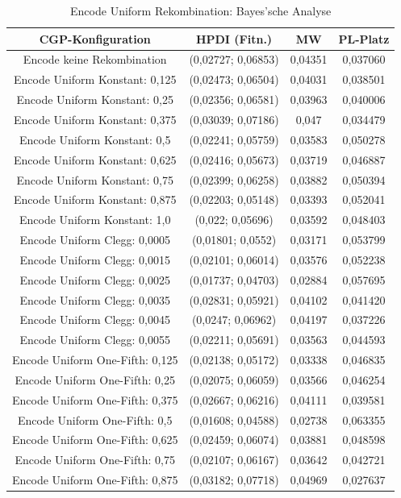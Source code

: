 \begin{table}[H]
	\centering
	\begin{tabular}{c | c | c | c}
		\textbf{CGP-Konfiguration} & \textbf{HPDI (Fitn.)} & \textbf{MW} & \textbf{PL-Platz}\\
		\hline
		Encode keine Rekombination & (0,02727; 0,06853) & 0,04351 & 0,037060\\
		\hline
		Encode Uniform Konstant: 0,125 & (0,02473; 0,06504) & 0,04031 & 0,038501\\
		\hline
		Encode Uniform Konstant: 0,25 & (0,02356; 0,06581) & 0,03963 & 0,040006\\
		\hline
		Encode Uniform Konstant: 0,375 & (0,03039; 0,07186) & 0,047 & 0,034479\\
		\hline
		Encode Uniform Konstant: 0,5 & (0,02241; 0,05759) & 0,03583 & 0,050278\\
		\hline
		Encode Uniform Konstant: 0,625 & (0,02416; 0,05673) & 0,03719 & 0,046887\\
		\hline
		Encode Uniform Konstant: 0,75 & (0,02399; 0,06258) & 0,03882 & 0,050394\\
		\hline
		Encode Uniform Konstant: 0,875 & (0,02203; 0,05148) & 0,03393 & 0,052041\\
		\hline
		Encode Uniform Konstant: 1,0 & (0,022; 0,05696) & 0,03592 & 0,048403\\
		\hline
		Encode Uniform Clegg: 0,0005 & (0,01801; 0,0552) & 0,03171 & 0,053799\\
		\hline
		Encode Uniform Clegg: 0,0015 & (0,02101; 0,06014) & 0,03576 & 0,052238\\
		\hline
		Encode Uniform Clegg: 0,0025 & (0,01737; 0,04703) & 0,02884 & 0,057695\\
		\hline
		Encode Uniform Clegg: 0,0035 & (0,02831; 0,05921) & 0,04102 & 0,041420\\
		\hline
		Encode Uniform Clegg: 0,0045 & (0,0247; 0,06962) & 0,04197 & 0,037226\\
		\hline
		Encode Uniform Clegg: 0,0055 & (0,02211; 0,05691) & 0,03563 & 0,044593\\
		\hline
		Encode Uniform One-Fifth: 0,125 & (0,02138; 0,05172) & 0,03338 & 0,046835\\
		\hline
		Encode Uniform One-Fifth: 0,25 & (0,02075; 0,06059) & 0,03566 & 0,046254\\
		\hline
		Encode Uniform One-Fifth: 0,375 & (0,02667; 0,06216) & 0,04111 & 0,039581\\
		\hline
		Encode Uniform One-Fifth: 0,5 & (0,01608; 0,04588) & 0,02738 & 0,063355\\
		\hline
		Encode Uniform One-Fifth: 0,625 & (0,02459; 0,06074) & 0,03881 & 0,048598\\
		\hline
		Encode Uniform One-Fifth: 0,75 & (0,02107; 0,06167) & 0,03642 & 0,042721\\
		\hline
		Encode Uniform One-Fifth: 0,875 & (0,03182; 0,07718) & 0,04969 & 0,027637\\
	\end{tabular}
	\label{table:encodeUniformBayesian}
	\caption{Encode Uniform Rekombination: Bayes'sche Analyse}
\end{table}

